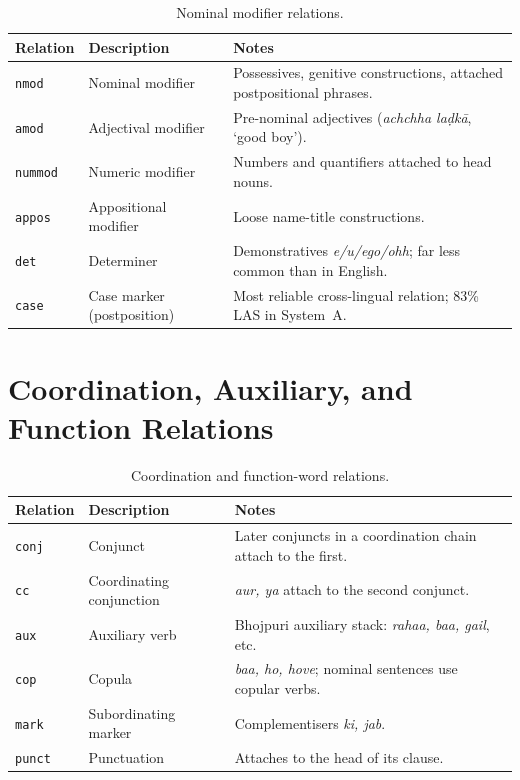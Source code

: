 \documentclass[12pt,a4paper,oneside]{report}
\begin{document}
\begin{table}[ht]
\centering
\caption{Nominal modifier relations.}
\label{tab:ud_nominal}
\begin{tabular}{@{}p{1.8cm}p{4.0cm}p{7.5cm}@{}}
\toprule
\textbf{Relation} & \textbf{Description} & \textbf{Notes} \\
\midrule
\texttt{nmod}     & Nominal modifier              & Possessives, genitive constructions, attached postpositional phrases. \\
\texttt{amod}     & Adjectival modifier           & Pre-nominal adjectives (\emph{achchha laḍkā}, `good boy'). \\
\texttt{nummod}   & Numeric modifier              & Numbers and quantifiers attached to head nouns. \\
\texttt{appos}    & Appositional modifier         & Loose name-title constructions. \\
\texttt{det}      & Determiner                    & Demonstratives \emph{e/u/ego/ohh}; far less common than in English. \\
\texttt{case}     & Case marker (postposition)    & Most reliable cross-lingual relation; 83\% LAS in System~A. \\
\bottomrule
\end{tabular}
\end{table}

\section{Coordination, Auxiliary, and Function Relations}

\begin{table}[ht]
\centering
\caption{Coordination and function-word relations.}
\label{tab:ud_func}
\begin{tabular}{@{}p{1.8cm}p{4.0cm}p{7.5cm}@{}}
\toprule
\textbf{Relation} & \textbf{Description} & \textbf{Notes} \\
\midrule
\texttt{conj}     & Conjunct                      & Later conjuncts in a coordination chain attach to the first. \\
\texttt{cc}       & Coordinating conjunction      & \emph{aur, ya} attach to the second conjunct. \\
\texttt{aux}      & Auxiliary verb                & Bhojpuri auxiliary stack: \emph{rahaa, baa, gail}, etc. \\
\texttt{cop}      & Copula                        & \emph{baa, ho, hove}; nominal sentences use copular verbs. \\
\texttt{mark}     & Subordinating marker          & Complementisers \emph{ki, jab}. \\
\texttt{punct}    & Punctuation                   & Attaches to the head of its clause. \\
\bottomrule
\end{tabular}
\end{table}
\end{document}

